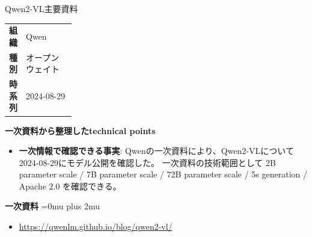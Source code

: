 \begin{technicalnote}{Qwen2-VL}{主要資料}
\begingroup
\begin{tabularx}{\linewidth}{@{}>{\bfseries}p{0.22\linewidth}X@{}}
組織 & Qwen \\
種別 & オープンウェイト \\
時系列 & 2024-08-29 \\
\end{tabularx}
\smallskip
{\bfseries 一次資料から整理したtechnical points}
\begin{itemize}[leftmargin=1.5em,itemsep=0.35em]
\item \textbf{一次情報で確認できる事実}: Qwenの一次資料により、Qwen2-VLについて2024-08-29にモデル公開を確認した。 一次資料の技術範囲として 2B parameter scale / 7B parameter scale / 72B parameter scale / 5s generation / Apache 2.0 を確認できる。
\end{itemize}
\begin{minipage}{\linewidth}
\begin{samepage}
{\bfseries 一次資料}
\begingroup\sloppy
\Urlmuskip=0mu plus 2mu\relax
\begin{itemize}[leftmargin=1.5em,itemsep=0.25em]
\item {\scriptsize\url{https://qwenlm.github.io/blog/qwen2-vl/}}
\end{itemize}
\endgroup
\end{samepage}
\end{minipage}
\endgroup
\end{technicalnote}
\medskip

